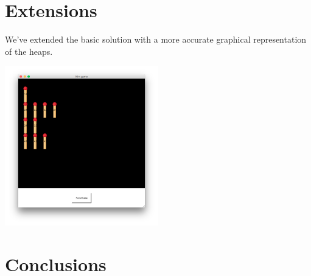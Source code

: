 \documentclass[10pt]{scrartcl}
\begin{document}
\section{Extensions}
We've extended the basic solution with a more accurate graphical representation of the heaps.	
\begin{center}
\includegraphics[width=0.5\textwidth]{game_ui}
\end{center}

\section{Conclusions}


\end{document}
